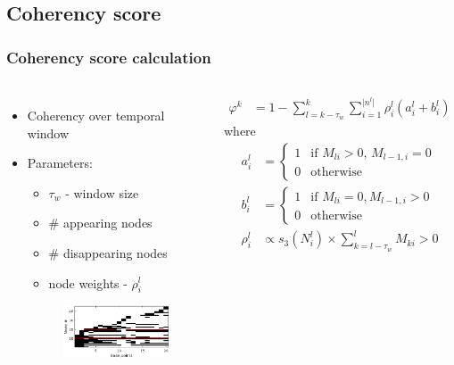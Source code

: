 \subsection{Coherency score}
\frame
{
	\frametitle{Coherency score calculation}
		
	\begin{columns}[T]
	\begin{itemize}
		\small
		\item Coherency over temporal window 
		\item Parameters:
			\begin{itemize}
				\item $\tau_w$ - window size
				\item \# appearing nodes
				\item \# disappearing nodes
				\item node weights - $\rho^l_i$
			\end{itemize}
		\begin{figure}[p]
			\centering
			\hspace{-1cm}
			\includegraphics[width = 1\textwidth]{img/icsc/node_continuity.eps}
			\label{fig:coh_score_3}
		\end{figure}
	\end{itemize}
	\hspace{-2cm}
	\small
	\begin{align}
	\varphi^k &= 1 - \sum\limits_{l=k-\tau_w}^{k}\sum\limits_{i=1}^{\lvert n^l \rvert}\rho^{l}_i (a^{l}_i + b^{l}_i) \label{eq:incoherency_score}	\end{align}
	where
	\begin{align}
	a^l_i &= \begin{cases}
	1 &\text{if }	M_{li}>0, \, M_{l-1,i}=0 \\
	0 &\text{otherwise}
	\end{cases}  \label{eq:a}	\\
	b^l_i &= \begin{cases}
	1 &\text{if }	M_{li}=0,  M_{l-1,i}>0 \\
	0 &\text{otherwise}
	\end{cases}  \label{eq:b}	\\
	\rho^l_i &\propto s_3(N^l_i) 
	\times \sum\limits_{k=l-{\tau_w}}^{l} M_{ki}>0 \label{eq:rho}									
	\end{align}

	\end{columns}
}
